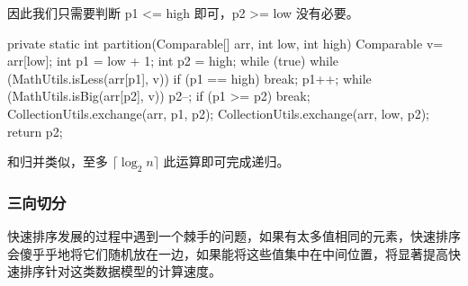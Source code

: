 因此我们只需要判断 p1 <= high 即可，p2 >= low 没有必要。

\begin{Java}
private static int partition(Comparable[] arr, int low, int high) {
    Comparable v= arr[low];
    int p1 = low + 1;
    int p2 = high;
    while (true) {
        while (MathUtils.isLess(arr[p1], v)) {
            if (p1 == high)
                break;
            p1++;
        }
        while (MathUtils.isBig(arr[p2], v)) {
            p2--;
        }
        if (p1 >= p2) break;
        CollectionUtils.exchange(arr, p1, p2);
    }
    CollectionUtils.exchange(arr, low, p2);
    return p2;
}
\end{Java}

和归并类似，至多 $\lceil \log_2 n \rceil$ 此运算即可完成递归。

\subsubsection{三向切分}

快速排序发展的过程中遇到一个棘手的问题，如果有太多值相同的元素，快速排序会傻乎乎地将它们随机放在一边，如果能将这些值集中在中间位置，将显著提高快速排序针对这类数据模型的计算速度。